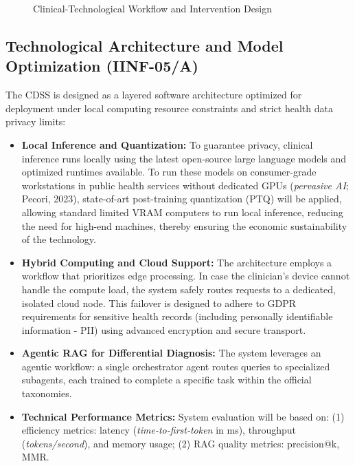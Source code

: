 \documentclass[11pt,a4paper]{article}
\begin{document}
\begin{figure}[htbp]
    \caption{Clinical-Technological Workflow and Intervention Design}
    \label{fig:workflow}
\end{figure}

\newpage

\subsection{Technological Architecture and Model Optimization (IINF-05/A)}

The CDSS is designed as a layered software architecture optimized for deployment under local computing resource constraints and strict health data privacy limits:
\begin{itemize}
    \item \textbf{Local Inference and Quantization:} To guarantee privacy, clinical inference runs locally using the latest open-source large language models and optimized runtimes available. To run these models on consumer-grade workstations in public health services without dedicated GPUs (\textit{pervasive AI}; Pecori, 2023), state-of-art post-training quantization (PTQ) will be applied, allowing standard limited VRAM computers to run local inference, reducing the need for high-end machines, thereby ensuring the economic sustainability of the technology.
    \item \textbf{Hybrid Computing and Cloud Support:} The architecture employs a workflow that prioritizes edge processing. In case the clinician's device cannot handle the compute load, the system safely routes requests to a dedicated, isolated cloud node. This failover is designed to adhere to GDPR requirements for sensitive health records (including personally identifiable information - PII) using advanced encryption and secure transport.
    \item \textbf{Agentic RAG for Differential Diagnosis:} The system leverages an agentic workflow: a single orchestrator agent routes queries to specialized subagents, each trained to complete a specific task within the official taxonomies. 
    \item \textbf{Technical Performance Metrics:} System evaluation will be based on: (1) efficiency metrics: latency (\textit{time-to-first-token} in ms), throughput (\textit{tokens/second}), and memory usage; (2) RAG quality metrics: precision@k, MMR.
\end{itemize}
\end{document}
